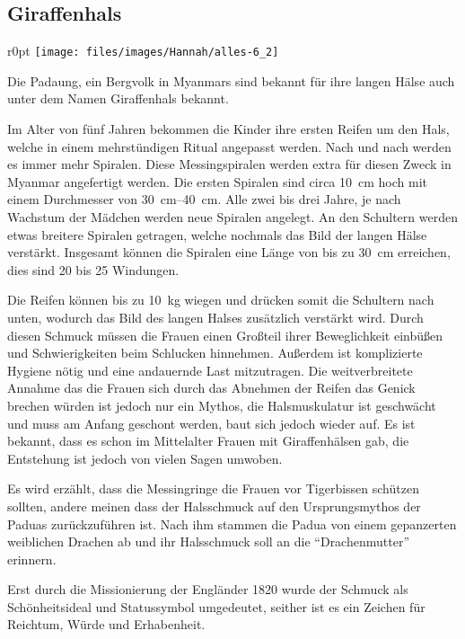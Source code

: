 \subsection{Giraffenhals}
\begin{wrapfigure}{r}{0pt}
	\texttt{[image: files/images/Hannah/alles-6\_2]}%
\end{wrapfigure}

Die Padaung, ein Bergvolk in Myanmars sind bekannt für ihre langen Hälse auch unter dem Namen
Giraffenhals bekannt.

Im Alter von fünf Jahren bekommen die Kinder ihre ersten Reifen um den Hals, welche in einem
mehrstündigen Ritual angepasst werden. Nach und nach werden es immer mehr Spiralen.
Diese Messingspiralen werden extra für diesen Zweck in Myanmar
angefertigt werden. Die ersten Spiralen sind circa \SI{10}{\centi\metre} hoch mit einem Durchmesser von
\SIrange{30}{40}{\centi\metre}. Alle zwei bis drei Jahre, je nach Wachstum der Mädchen werden neue
Spiralen angelegt. An den Schultern werden etwas breitere Spiralen getragen, welche nochmals das Bild
der langen Hälse verstärkt. Insgesamt können die Spiralen eine Länge von bis zu \SI{30}{\centi\metre}
erreichen, dies sind 20 bis 25 Windungen.

Die Reifen können bis zu \SI{10}{\kilo\gram} wiegen und drücken somit die Schultern nach unten,
wodurch das Bild des langen Halses zusätzlich verstärkt wird.
Durch diesen Schmuck müssen die Frauen einen Großteil ihrer
Beweglichkeit einbüßen und Schwierigkeiten beim Schlucken hinnehmen. Außerdem ist komplizierte
Hygiene nötig und
eine andauernde Last mitzutragen. Die weitverbreitete Annahme das die Frauen sich durch das Abnehmen
der Reifen das Genick brechen würden ist jedoch nur ein Mythos, die Halsmuskulatur ist geschwächt und
muss am Anfang geschont werden, baut sich jedoch wieder auf. Es ist bekannt, dass es schon im
Mittelalter Frauen mit Giraffenhälsen gab, die Entstehung ist jedoch von vielen Sagen umwoben.

Es wird erzählt, dass die Messingringe die Frauen vor Tigerbissen schützen sollten, andere meinen
dass der Halsschmuck auf den Ursprungsmythos der Paduas zurückzuführen ist. Nach ihm stammen die
Padua von einem gepanzerten weiblichen Drachen ab und ihr Halsschmuck soll an die \enquote{Drachenmutter}
erinnern.

Erst durch die Missionierung der Engländer 1820 wurde der Schmuck als Schönheitsideal und
Statussymbol umgedeutet,
seither ist es ein Zeichen für Reichtum, Würde und Erhabenheit.

